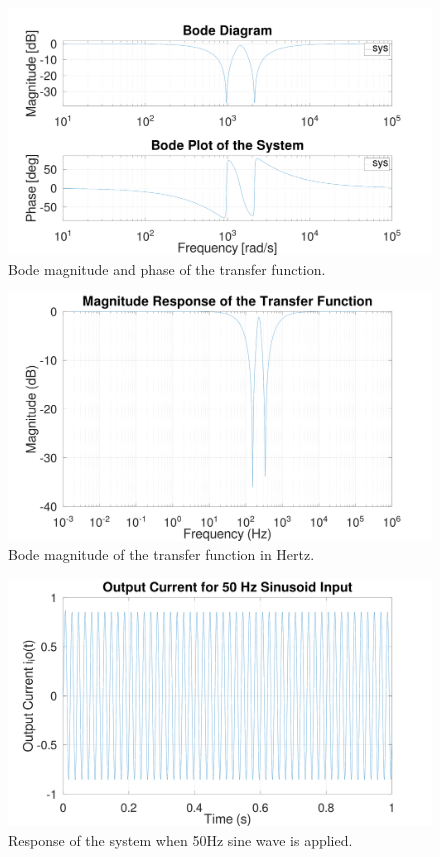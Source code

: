 \documentclass[11pt]{article}
\begin{document}
\begin{FIGURE}
\begin{figure}[H]
\centering
\includegraphics[width=.9\linewidth]{ENG204-Assignment-4-Bode1.png}
\caption{Bode magnitude and phase of the transfer function.}
\end{figure}
\end{FIGURE}
\begin{FIGURE}
\begin{figure}[H]
\centering
\includegraphics[width=.9\linewidth]{ENG204-Assignment-4-Bode2.png}
\caption{Bode magnitude of the transfer function in Hertz.}
\end{figure}
\end{FIGURE}
\begin{FIGURE}
\begin{figure}[H]
\centering
\includegraphics[width=.9\linewidth]{ENG204-Assignment-4-50Hz.png}
\caption{Response of the system when 50Hz sine wave is applied.}
\end{figure}
\end{FIGURE}
\end{document}
